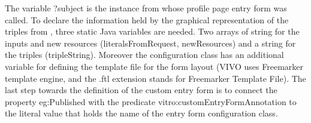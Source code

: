 
The variable ?subject is the instance from whose profile page entry form was called.  To declare the information held by the graphical representation of the triples from , three static Java variables are needed. Two arrays of string for the inputs and new resources (literalsFromRequest, newResources) and a string for the triples (tripleString).  Moreover the configuration class has an additional variable for defining the template file for the form layout (VIVO uses Freemarker template engine, and the .ftl extension stands for Freemarker Template File). 
The last step towards the definition of the custom entry form is to connect the property eg:Published with the predicate vitro:customEntryFormAnnotation to the literal value that holds the name of the entry form configuration class.


